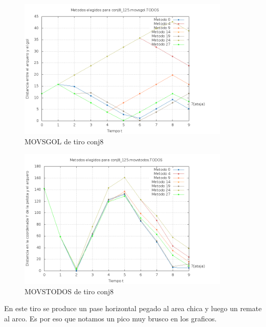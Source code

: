 \begin{figure}[H]
\begin{center}
\includegraphics[width=0.9\textwidth]{img/conj8_125_movsgol_TODOS_elegidos.png}
     \caption{MOVSGOL de tiro conj8}
\end{center}
\end{figure}

\begin{figure}[H]
\begin{center}
\includegraphics[width=0.9\textwidth]{img/conj8_125_movstodos_TODOS_elegidos.png}
     \caption{MOVSTODOS de tiro conj8}
\end{center}
\end{figure}

En este tiro se produce un pase horizontal pegado al area chica y luego un remate al arco. Es por
eso que notamos un pico muy brusco en los graficos. 


